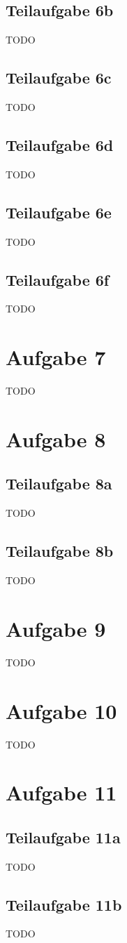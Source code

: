 \documentclass[a4paper]{scrartcl}
\begin{document}
\subsection*{Teilaufgabe 6b}
TODO
\subsection*{Teilaufgabe 6c}
TODO
\subsection*{Teilaufgabe 6d}
TODO
\subsection*{Teilaufgabe 6e}
TODO
\subsection*{Teilaufgabe 6f}
TODO

\section*{Aufgabe 7}
TODO

\section*{Aufgabe 8}
\subsection*{Teilaufgabe 8a}
TODO
\subsection*{Teilaufgabe 8b}
TODO

\section*{Aufgabe 9}
TODO

\section*{Aufgabe 10}
TODO

\section*{Aufgabe 11}
\subsection*{Teilaufgabe 11a}
TODO
\subsection*{Teilaufgabe 11b}
TODO
\end{document}
